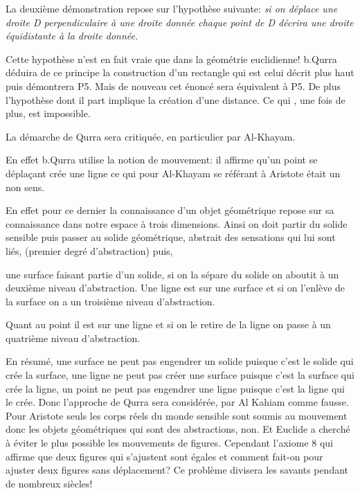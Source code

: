 \documentclass[a4paper, 12pt, twoside]{book}
\begin{document}
     La deuxième démonstration repose sur l'hypothèse suivante: \textit{si on déplace une droite D perpendiculaire à une droite donnée chaque point de D décrira une droite équidistante à la droite donnée.} \bigskip 
      
    
    Cette hypothèse n'est en fait vraie que dans la géométrie euclidienne! 
  b.Qurra déduira de ce principe la construction d'un rectangle qui est celui décrit plus haut puis démontrera P5. Mais de nouveau cet énoncé sera équivalent à P5.
  De plus l'hypothèse dont il part implique la création d'une distance. Ce qui , une fois de plus, est impossible.\bigskip 
 
   
     La démarche de Qurra sera critiquée, en particulier par Al-Khayam.\
     
     
En effet b.Qurra utilise la notion de mouvement: il affirme qu'un point se déplaçant crée une ligne ce qui pour Al-Khayam se référant à Aristote était un non sens.
\bigskip 

 En effet pour ce dernier la connaissance d'un objet géométrique repose sur sa connaissance dans notre espace à trois dimensions. Ainsi  on doit partir du solide sensible puis passer au solide géométrique, abstrait des sensations qui lui sont liés, (premier degré d'abstraction) puis,\
 
  une surface faisant partie d'un solide, si on la sépare du solide on aboutit à un deuxième niveau d'abstraction. Une ligne est sur une surface et si on l'enlève de la surface on a un troisième niveau d'abstraction. \
  
  Quant au point il est sur une ligne et si on le retire de la ligne on passe à un quatrième niveau d'abstraction. 
  \
  
  
 En  résumé, une surface ne peut pas engendrer un solide puisque c'est le solide qui crée la surface, une ligne ne peut pas créer une surface puisque c'est la surface qui crée la ligne, un point ne peut pas engendrer une ligne puisque c'est la ligne qui le crée. Donc l'approche de Qurra sera considérée, par Al Kahiam comme fausse.\\
 
 Pour Aristote  seuls les corps réels du monde sensible sont soumis au mouvement donc les objets géométriques qui sont des abstractions, non. Et Euclide a cherché à éviter le plus possible  les mouvements de figures. Cependant l'axiome 8 qui affirme que deux figures qui s'ajustent sont égales et comment fait-on pour ajuster deux figures sans déplacement? Ce problème divisera les savants pendant de nombreux siècles!
 
\end{document}

